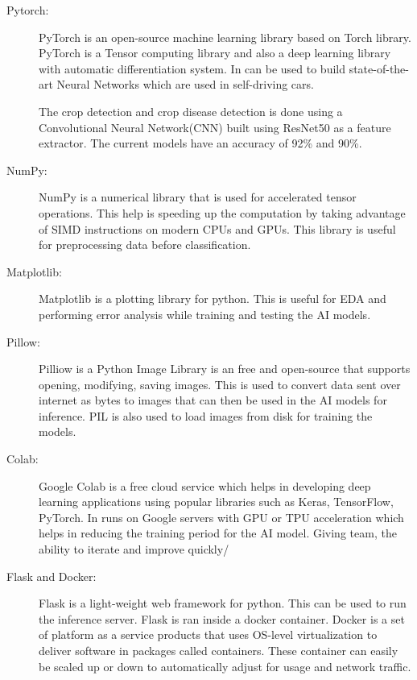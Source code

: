 \documentclass[../Report.tex]{subfiles}
\begin{document}
\begin{description}
  \item[Pytorch: ] PyTorch is an open-source machine learning library based on Torch library. PyTorch is a Tensor computing library and also 
  a deep learning library with automatic differentiation system. In can be used to build state-of-the-art Neural Networks which are used in
  self-driving cars.\par
  The crop detection and crop disease detection is done using a Convolutional Neural Network(CNN) built using ResNet50 as a feature extractor.
  The current models have an accuracy of 92\% and 90\%.

  \item[NumPy: ] NumPy is a numerical library that is used for accelerated tensor operations. This help is speeding up the computation by 
  taking advantage of SIMD instructions on modern CPUs and GPUs. This library is useful for preprocessing data before classification.

  \item[Matplotlib: ] Matplotlib is a plotting library for python. This is useful for EDA and performing error analysis while training 
  and testing the AI models.

  \item[Pillow: ] Pilliow is a Python Image Library is an free and open-source that supports opening, modifying, saving images. This is used to convert data
  sent over internet as bytes to images that can then be used in the AI models for inference. PIL is also used to load images from disk for
  training the models.

  \item[Colab: ] Google Colab is a free cloud service which helps in developing deep learning applications using popular libraries such 
  as Keras, TensorFlow, PyTorch. In runs on Google servers with GPU or TPU acceleration which helps in reducing the training period for 
  the AI model. Giving team, the ability to iterate and improve quickly/

  \item[Flask and Docker: ] Flask is a light-weight web framework for python. This can be used to run the inference server. Flask is ran
  inside a docker container. Docker is a set of platform as a service products that uses OS-level virtualization to deliver software in 
  packages called containers. These container can easily be scaled up or down to automatically adjust for usage and network traffic.


\end{description}
\end{document}
